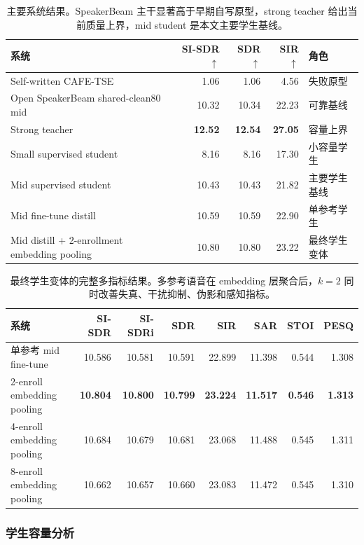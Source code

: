 \documentclass[UTF8,zihao=5,a4paper]{ctexart}
\newcommand{\sisdr}{SI-SDR}
\begin{document}
\begin{table}[H]
\centering
\small
\begin{tabular}{@{}p{4.7cm}rrrp{2.4cm}@{}}
\toprule
系统 & \sisdr{}$\uparrow$ & SDR$\uparrow$ & SIR$\uparrow$ & 角色 \\
\midrule
Self-written CAFE-TSE & 1.06 & 1.06 & 4.56 & 失败原型 \\
Open SpeakerBeam shared-clean80 mid & 10.32 & 10.34 & 22.23 & 可靠基线 \\
Strong teacher & \textbf{12.52} & \textbf{12.54} & \textbf{27.05} & 容量上界 \\
Small supervised student & 8.16 & 8.16 & 17.30 & 小容量学生 \\
Mid supervised student & 10.43 & 10.43 & 21.82 & 主要学生基线 \\
Mid fine-tune distill & 10.59 & 10.59 & 22.90 & 单参考学生 \\
Mid distill + 2-enrollment embedding pooling & 10.80 & 10.80 & 23.22 & 最终学生变体 \\
\bottomrule
\end{tabular}
\normalsize
\caption{主要系统结果。SpeakerBeam 主干显著高于早期自写原型，strong teacher 给出当前质量上界，mid student 是本文主要学生基线。}
\label{tab:main}
\end{table}

\begin{table}[H]
\centering
\small
\begin{tabular}{lrrrrrrr}
\toprule
系统 & \sisdr{} & \sisdr{}i & SDR & SIR & SAR & STOI & PESQ \\
\midrule
单参考 mid fine-tune & 10.586 & 10.581 & 10.591 & 22.899 & 11.398 & 0.544 & 1.308 \\
2-enroll embedding pooling & \textbf{10.804} & \textbf{10.800} & \textbf{10.799} & \textbf{23.224} & \textbf{11.517} & \textbf{0.546} & \textbf{1.313} \\
4-enroll embedding pooling & 10.684 & 10.679 & 10.681 & 23.068 & 11.488 & 0.545 & 1.311 \\
8-enroll embedding pooling & 10.662 & 10.657 & 10.660 & 23.083 & 11.472 & 0.545 & 1.310 \\
\bottomrule
\end{tabular}
\normalsize
\caption{最终学生变体的完整多指标结果。多参考语音在 embedding 层聚合后，$k=2$ 同时改善失真、干扰抑制、伪影和感知指标。}
\label{tab:final-full-metrics}
\end{table}

\subsubsection{学生容量分析}
\end{document}
